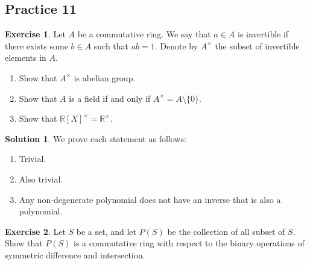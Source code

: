 \documentclass[12pt]{article}
\theoremstyle{definition}
\newcommand{\R}{\mathbb{R}}
\newtheorem{exercise}{\color{YellowOrange}Exercise}
\theoremstyle{definition}
\newtheorem{solution}{\color{Goldenrod}Solution}
\begin{document}
\subsection{Practice 11}
\begin{exercise}
	Let $A$ be a commutative ring. We say that $a \in A$ is invertible if there exists some $b \in A$ such that $ab = 1$. Denote by $A^{\times}$ the subset of invertible elements in $A$. 
	\begin{enumerate}
		\item Show that $A^{\times}$ is abelian group.
		\item Show that $A$ is a field if and only if $A^{\times} = A \setminus \{0\}$.
		\item Show that $\R[X]^{\times} = \R^{\times}$.
	\end{enumerate}
\end{exercise}
\begin{solution}
We prove each statement as follows:
\begin{enumerate}
	\item Trivial.
	\item Also trivial.
	\item Any non-degenerate polynomial does not have an inverse that is also a polynomial.
\end{enumerate}
\end{solution}

\begin{exercise}
	Let $S$ be a set, and let $P(S)$ be the collection of all subset of $S$. Show that $P(S)$ is a commutative ring with respect to the binary operations of symmetric difference and intersection. 
\end{exercise}
\end{document}

